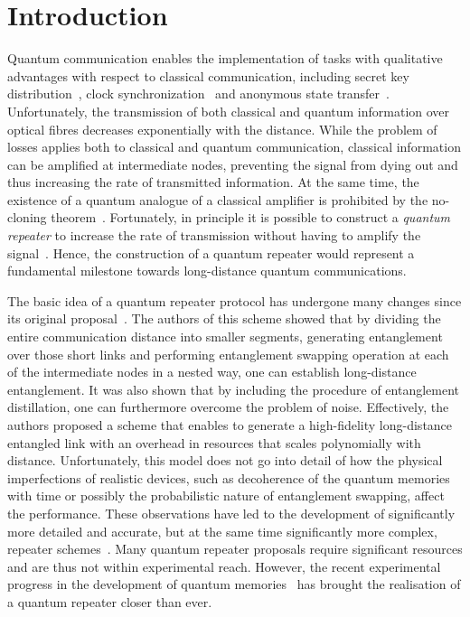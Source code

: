 \documentclass[aps,pra,reprint,superscriptaddress]{revtex4-1}
\begin{document}
    \maketitle
\onecolumngrid
\section{Introduction}

Quantum communication enables the implementation of tasks with qualitative advantages with respect to classical communication, including secret key distribution~\cite{Bennett_84,Ekert_91}, clock synchronization~\cite{Giovanetti_01} and anonymous state transfer~\cite{christandl2005quantum}. 
Unfortunately, the transmission of both classical and quantum information over optical fibres decreases exponentially with the distance. 
While the problem of losses applies both to classical and quantum communication, classical information can be amplified at intermediate nodes, preventing the signal from dying out and thus increasing the rate of transmitted information. 
At the same time, the existence of a quantum analogue of a classical amplifier is prohibited by the no-cloning theorem~\cite{wootters1982single}. Fortunately, in principle it is possible to construct a \emph{quantum repeater} to increase the rate of transmission without having to amplify the signal~\cite{briegel1998quantum, Munro_15}. Hence, the construction of a quantum repeater would represent a fundamental milestone towards long-distance quantum communications.

The basic idea of a quantum repeater protocol has undergone many changes since its original proposal~\cite{briegel1998quantum}. The authors of this scheme showed that by dividing the entire communication distance into smaller segments, generating entanglement over those short links and performing entanglement swapping operation at each of the intermediate nodes in a nested way, one can establish long-distance entanglement. It was also shown that by including the procedure of entanglement distillation, one can furthermore overcome the problem of noise. Effectively, the authors proposed a scheme that enables to generate a high-fidelity long-distance entangled link with an overhead in resources that scales polynomially with distance. Unfortunately, this model does not go into detail of how the physical imperfections of realistic devices, such as decoherence of the quantum memories with time or possibly the probabilistic nature of entanglement swapping, affect the performance. These observations have led to the development of significantly more detailed and accurate, but at the same time significantly more complex, repeater schemes~\cite{duan2001long, jiang2009quantum, munro2010quantum, munro2012quantum, Azuma_15}. Many quantum repeater proposals require significant resources and are thus not within experimental reach. However, the recent experimental progress in the development of quantum memories~\cite{reiserer2016robust, lvovsky2009optical, specht2011single} has brought the realisation of a quantum repeater closer than ever.
\end{document}

